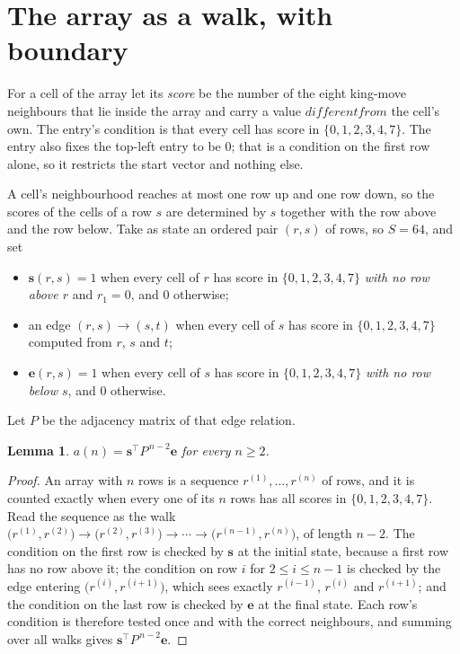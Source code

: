 \documentclass[11pt,a4paper]{article}
\theoremstyle{plain}
\newtheorem{lemma}[theorem]{Lemma}
\theoremstyle{definition}
\begin{document}
\section{The array as a walk, with boundary}

For a cell of the array let its \emph{score} be the number of the eight king-move neighbours that lie inside
the array and carry a value $different from$ the cell's own. The entry's condition is that every cell
has score in $\{0,1,2,3,4,7\}$. The entry also fixes the top-left entry to be $0$; that is a condition on the first row alone, so it restricts the start vector and nothing else.

A cell's neighbourhood reaches at most one row up and one row down, so the scores of the
cells of a row $s$ are determined by $s$ together with the row above and the row below.
Take as state an ordered pair $(r,s)$ of rows, so $S=64$, and set
\begin{itemize}
\item $\mathbf{s}(r,s)=1$ when every cell of $r$ has score in $\{0,1,2,3,4,7\}$ \emph{with no row
above $r$} and $r_1=0$, and $0$ otherwise;
\item an edge $(r,s)\to(s,t)$ when every cell of $s$ has score in $\{0,1,2,3,4,7\}$ computed from
$r$, $s$ and $t$;
\item $\mathbf{e}(r,s)=1$ when every cell of $s$ has score in $\{0,1,2,3,4,7\}$ \emph{with no row
below $s$}, and $0$ otherwise.
\end{itemize}
Let $P$ be the adjacency matrix of that edge relation.

\begin{lemma}\label{lem:walk}
$a(n)=\mathbf{s}^{\!\top}P^{\,n-2}\mathbf{e}$ for every $n\ge2$.
\end{lemma}

\begin{proof}
An array with $n$ rows is a sequence $r^{(1)},\dots,r^{(n)}$ of rows, and it is counted
exactly when every one of its $n$ rows has all scores in $\{0,1,2,3,4,7\}$. Read the sequence as the
walk $\bigl(r^{(1)},r^{(2)}\bigr)\to\bigl(r^{(2)},r^{(3)}\bigr)\to\cdots\to
\bigl(r^{(n-1)},r^{(n)}\bigr)$, of length $n-2$. The condition on the first row is
checked by $\mathbf{s}$ at the initial state, because a first row has no row above it; the
condition on row $i$ for $2\le i\le n-1$ is checked by the edge entering
$\bigl(r^{(i)},r^{(i+1)}\bigr)$, which sees exactly $r^{(i-1)}$, $r^{(i)}$ and
$r^{(i+1)}$; and the condition on the last row is checked by $\mathbf{e}$ at the final
state. Each row's condition is therefore tested once and with the correct neighbours, and
summing over all walks gives $\mathbf{s}^{\!\top}P^{\,n-2}\mathbf{e}$.
\end{proof}
\end{document}
